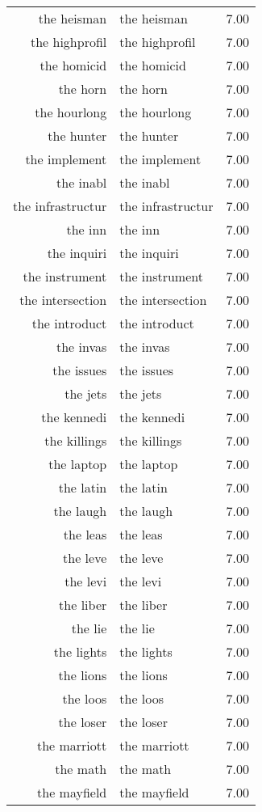 \begin{table}[ht]
\begin{tabular}{rlr}
  the heisman & the heisman & 7.00 \\ 
  the highprofil & the highprofil & 7.00 \\ 
  the homicid & the homicid & 7.00 \\ 
  the horn & the horn & 7.00 \\ 
  the hourlong & the hourlong & 7.00 \\ 
  the hunter & the hunter & 7.00 \\ 
  the implement & the implement & 7.00 \\ 
  the inabl & the inabl & 7.00 \\ 
  the infrastructur & the infrastructur & 7.00 \\ 
  the inn & the inn & 7.00 \\ 
  the inquiri & the inquiri & 7.00 \\ 
  the instrument & the instrument & 7.00 \\ 
  the intersection & the intersection & 7.00 \\ 
  the introduct & the introduct & 7.00 \\ 
  the invas & the invas & 7.00 \\ 
  the issues & the issues & 7.00 \\ 
  the jets & the jets & 7.00 \\ 
  the kennedi & the kennedi & 7.00 \\ 
  the killings & the killings & 7.00 \\ 
  the laptop & the laptop & 7.00 \\ 
  the latin & the latin & 7.00 \\ 
  the laugh & the laugh & 7.00 \\ 
  the leas & the leas & 7.00 \\ 
  the leve & the leve & 7.00 \\ 
  the levi & the levi & 7.00 \\ 
  the liber & the liber & 7.00 \\ 
  the lie & the lie & 7.00 \\ 
  the lights & the lights & 7.00 \\ 
  the lions & the lions & 7.00 \\ 
  the loos & the loos & 7.00 \\ 
  the loser & the loser & 7.00 \\ 
  the marriott & the marriott & 7.00 \\ 
  the math & the math & 7.00 \\ 
  the mayfield & the mayfield & 7.00 \\ 

\end{tabular}
\end{table}
